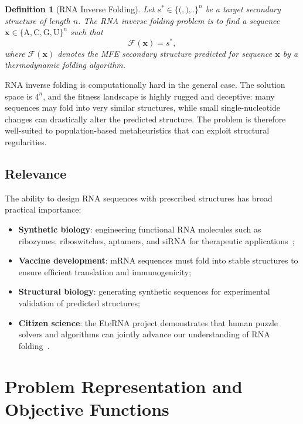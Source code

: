 \documentclass[11pt,a4paper]{article}
\newtheorem{definition}{Definition}
\begin{document}
\begin{definition}[RNA Inverse Folding]
Let $s^* \in \{\texttt{(},\texttt{)},\texttt{.}\}^n$ be a target secondary
structure of length $n$. The RNA inverse folding problem is to find a
sequence $\mathbf{x} \in \{\mathrm{A,C,G,U}\}^n$ such that
\[
  \mathcal{F}(\mathbf{x}) = s^*,
\]
where $\mathcal{F}(\mathbf{x})$ denotes the MFE secondary structure
predicted for sequence $\mathbf{x}$ by a thermodynamic folding algorithm.
\end{definition}

RNA inverse folding is computationally hard in the general case. The solution
space is $4^n$, and the fitness landscape is highly rugged and deceptive: many
sequences may fold into very similar structures, while small single-nucleotide
changes can drastically alter the predicted structure. The problem is
therefore well-suited to population-based metaheuristics that can exploit
structural regularities.

\subsection{Relevance}

The ability to design RNA sequences with prescribed structures has broad
practical importance:
\begin{itemize}
  \item \textbf{Synthetic biology}: engineering functional RNA molecules such
    as ribozymes, riboswitches, aptamers, and siRNA for therapeutic
    applications~\cite{wachsmuth2013riboswitch};
  \item \textbf{Vaccine development}: mRNA sequences must fold into stable
    structures to ensure efficient translation and immunogenicity;
  \item \textbf{Structural biology}: generating synthetic sequences for
    experimental validation of predicted structures;
  \item \textbf{Citizen science}: the EteRNA project demonstrates that human
    puzzle solvers and algorithms can jointly advance our understanding of
    RNA folding~\cite{lee2014eterna}.
\end{itemize}

\section{Problem Representation and Objective Functions}
\label{sec:representation}
\end{document}
